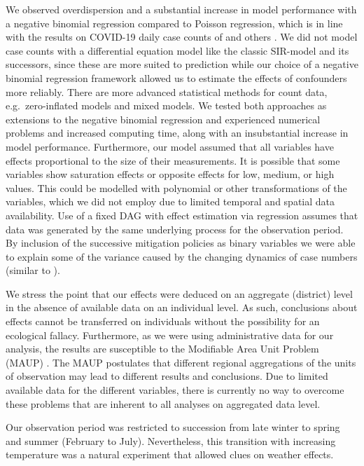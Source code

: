 \documentclass[]{elsarticle} %
\begin{document}
We observed overdispersion and a substantial increase in model
performance with a negative binomial regression compared to Poisson
regression, which is in line with the results on COVID-19 daily case
counts of \citet{kraemer_effect_2020} and others
\citep{liu_impact_2020, bannister-tyrrell_preliminary_2020, Islamm2743}.
We did not model case counts with a differential equation model like the
classic SIR-model \citep{kermack1991contributions} and its successors,
since these are more suited to prediction
\citep[e.g.][]{rkimodellierung} while our choice of a negative binomial
regression framework allowed us to estimate the effects of confounders
more reliably. There are more advanced statistical methods for count
data, e.g.~zero-inflated models and mixed models. We tested both
approaches as extensions to the negative binomial regression and
experienced numerical problems and increased computing time, along with
an insubstantial increase in model performance. Furthermore, our model
assumed that all variables have effects proportional to the size of
their measurements. It is possible that some variables show saturation
effects or opposite effects for low, medium, or high values. This could
be modelled with polynomial or other transformations of the variables,
which we did not employ due to limited temporal and spatial data
availability. Use of a fixed DAG with effect estimation via regression
assumes that data was generated by the same underlying process for the
observation period. By inclusion of the successive mitigation policies
as binary variables we were able to explain some of the variance caused
by the changing dynamics of case numbers (similar to
\citep{Islamm2743}).

We stress the point that our effects were deduced on an aggregate
(district) level in the absence of available data on an individual
level. As such, conclusions about effects cannot be transferred on
individuals without the possibility for an ecological fallacy.
Furthermore, as we were using administrative data for our analysis, the
results are susceptible to the Modifiable Area Unit Problem (MAUP)
\citep{Openshaw1984}. The MAUP postulates that different regional
aggregations of the units of observation may lead to different results
and conclusions. Due to limited available data for the different
variables, there is currently no way to overcome these problems that are
inherent to all analyses on aggregated data level.

Our observation period was restricted to succession from late winter to
spring and summer (February to July). Nevertheless, this transition with
increasing temperature was a natural experiment that allowed clues on
weather effects.
\end{document}
